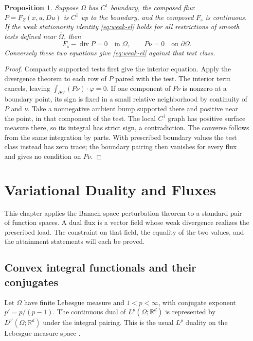 \documentclass[11pt,oneside,openany]{book}
\newcommand{\R}{\mathbb R}
\theoremstyle{plain}
\newtheorem{proposition}[theorem]{Proposition}
\theoremstyle{definition}
\theoremstyle{remark}
\begin{document}
\begin{proposition}\label{prop:natural-boundary}
Suppose \(\Omega\) has \(C^1\) boundary, the composed flux
\(P=F_Z(x,u,Du)\) is \(C^1\) up to the boundary, and
the composed \(F_s\) is continuous. If the weak stationarity identity
\eqref{eq:weak-el} holds for all restrictions of smooth tests defined
near \(\overline\Omega\), then
\[
 F_s-\operatorname{div}P=0\quad\text{in }\Omega,\qquad
 P\nu=0\quad\text{on }\partial\Omega .
\]
Conversely these two equations give \eqref{eq:weak-el} against that
test class.
\end{proposition}
\begin{proof}
Compactly supported tests first give the interior equation.
Apply the divergence theorem to each row of \(P\) paired
with the test. The interior term cancels, leaving
\(\int_{\partial\Omega}(P\nu)\cdot\varphi=0\).
If one component of \(P\nu\) is nonzero at a boundary
point, its sign is fixed in a small relative neighborhood
by continuity of \(P\) and \(\nu\). Take a nonnegative
ambient bump supported there and positive near the point,
in that component of the test. The local \(C^1\) graph
has positive surface measure there, so its integral has
strict sign, a contradiction. The converse follows from
the same integration by parts. With prescribed boundary
values the test class instead has zero trace; the boundary
pairing then vanishes for every flux and gives no condition
on \(P\nu\).
\end{proof}
\chapter{Variational Duality and Fluxes}
\label{chap:flux-duality}

This chapter applies the Banach-space perturbation theorem to a
standard pair of function spaces. A dual flux is a vector field
whose weak divergence realizes the prescribed load. The
constraint on that field, the equality of the two values, and
the attainment statements will each be proved.

\section{Convex integral functionals and their conjugates}
\label{v09-01}

Let \(\Omega\) have finite Lebesgue measure and \(1<p<\infty\),
with conjugate exponent \(p'=p/(p-1)\). The continuous dual of
\(L^p(\Omega;\R^d)\) is represented by \(L^{p'}(\Omega;\R^d)\)
under the integral pairing. This is the usual \(L^p\) duality
on the Lebesgue measure space \cite[Section 4.3]{Brezis}.
\end{document}
